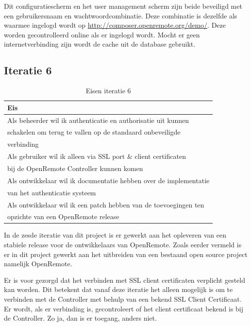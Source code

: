 \documentclass[]{article}
\begin{document}
Dit configuratiescherm en het user management scherm zijn beide beveiligd met
een gebruikersnaam en wachtwoordcombinatie. Deze combinatie is dezelfde als
waarmee ingelogd wordt op \url{http://composer.openremote.org/demo/}. 
Deze worden gecontrolleerd online als er ingelogd wordt. Mocht er geen
internetverbinding zijn wordt de cache uit de database gebruikt.

\subsection{Iteratie 6}
\begin{table}[htpb]
  \caption{Eisen iteratie 6}
  \begin{center}
    \begin{tabular}{|| l ||}\hline
        Eis                                                              \\\hline\hline
        Als beheerder wil ik authenticatie en authorisatie uit kunnen    \\
        schakelen om terug te vallen op de standaard onbeveiligde        \\ 
        verbinding                                                       \\\hline
        Als gebruiker wil ik alleen via SSL port \& client certificaten  \\ 
        bij de OpenRemote Controller kunnen komen                        \\\hline
        Als ontwikkelaar wil ik documentatie hebben over de implementatie\\ 
        van het authenticatie systeem                                    \\\hline
        Als ontwikkelaar wil ik een patch hebben van de toevoegingen ten \\
        opzichte van een OpenRemote release                              \\\hline
    \end{tabular}
  \end{center}
\end{table}

In de zesde iteratie van dit project is er gewerkt aan het opleveren van een
stabiele release voor de ontwikkelaars van OpenRemote. Zoals eerder vermeld is
er in dit project gewerkt aan het uitbreiden van een bestaand open source
project namelijk OpenRemote. 

Er is voor gezorgd dat het verbinden met SSL client certificaten verplicht
gesteld kan worden. Dit betekent dat vanaf deze iteratie het alleen mogelijk is
om te verbinden met de Controller met behulp van een bekend SSL Client
Certificaat. Er wordt,
als er verbinding is, gecontroleert of het client certificaat bekend
is bij de Controller. Zo ja, dan is er toegang, anders niet.
\end{document}
